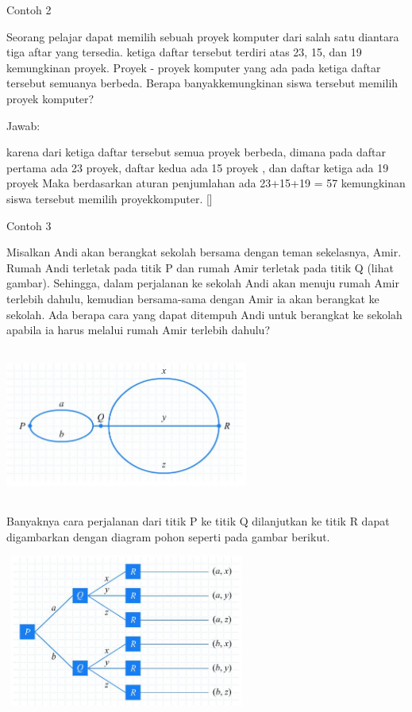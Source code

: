 \documentclass[11pt,fleqn]{book} %
\begin{document}
Contoh 2

Seorang pelajar dapat memilih sebuah proyek komputer dari salah satu diantara tiga aftar yang tersedia. ketiga daftar tersebut terdiri atas 23, 15, dan 19 kemungkinan proyek. Proyek - proyek komputer yang ada pada ketiga daftar tersebut semuanya berbeda. Berapa banyakkemungkinan siswa tersebut memilih proyek komputer?

Jawab: 

karena dari ketiga daftar tersebut semua proyek berbeda, dimana pada daftar pertama ada 23 proyek, daftar kedua ada 15 proyek , dan daftar ketiga ada 19 proyek Maka  berdasarkan aturan penjumlahan ada 23+15+19 = 57 kemungkinan siswa tersebut memilih proyekkomputer. []

Contoh 3

Misalkan Andi akan berangkat sekolah bersama dengan teman sekelasnya, Amir. Rumah Andi terletak pada titik P dan rumah Amir terletak pada titik Q (lihat gambar). Sehingga, dalam perjalanan ke sekolah Andi akan menuju rumah Amir terlebih dahulu, kemudian bersama-sama dengan Amir ia akan berangkat ke sekolah. Ada berapa cara yang dapat ditempuh Andi untuk berangkat ke sekolah apabila ia harus melalui rumah Amir terlebih dahulu?

 \includegraphics[width = 8cm, height= 5cm]{Pictures/contoh3.JPG}

Banyaknya cara perjalanan dari titik P ke titik Q dilanjutkan ke titik R dapat digambarkan dengan diagram pohon seperti pada gambar berikut.

 \includegraphics[width = 8cm, height= 5cm]{Pictures/contoh3a.JPG}
 
\end{document}
